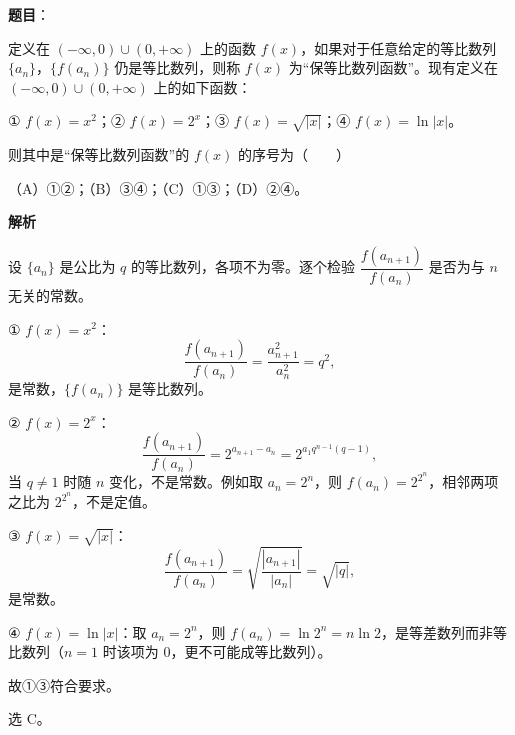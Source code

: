 \begin{answer}

\textbf{题目}：

定义在 $(-\infty,0)\cup(0,+\infty)$ 上的函数 $f(x)$，如果对于任意给定的等比数列 $\{a_n\}$，$\{f(a_n)\}$ 仍是等比数列，则称 $f(x)$ 为“保等比数列函数”。现有定义在 $(-\infty,0)\cup(0,+\infty)$ 上的如下函数：

① $f(x)=x^2$；② $f(x)=2^x$；③ $f(x)=\sqrt{|x|}$；④ $f(x)=\ln|x|$。

则其中是“保等比数列函数”的 $f(x)$ 的序号为\mbox{（　　）}

（A）①②；（B）③④；（C）①③；（D）②④。

\textbf{解析}

设 $\{a_n\}$ 是公比为 $q$ 的等比数列，各项不为零。逐个检验 $\dfrac{f(a_{n+1})}{f(a_n)}$ 是否为与 $n$ 无关的常数。

① $f(x)=x^2$：
\nopagebreak[4]
\[\frac{f(a_{n+1})}{f(a_n)}=\frac{a_{n+1}^2}{a_n^2}=q^2,\]
是常数，$\{f(a_n)\}$ 是等比数列。

② $f(x)=2^x$：
\nopagebreak[4]
\[\frac{f(a_{n+1})}{f(a_n)}=2^{a_{n+1}-a_n}=2^{a_1q^{n-1}(q-1)},\]
当 $q\neq1$ 时随 $n$ 变化，不是常数。例如取 $a_n=2^n$，则 $f(a_n)=2^{2^n}$，相邻两项之比为 $2^{2^n}$，不是定值。

③ $f(x)=\sqrt{|x|}$：
\nopagebreak[4]
\[\frac{f(a_{n+1})}{f(a_n)}=\sqrt{\frac{|a_{n+1}|}{|a_n|}}=\sqrt{|q|},\]
是常数。

④ $f(x)=\ln|x|$：取 $a_n=2^n$，则 $f(a_n)=\ln2^n=n\ln2$，是等差数列而非等比数列（$n=1$ 时该项为 $0$，更不可能成等比数列）。

故①③符合要求。

选 C。


\end{answer}

